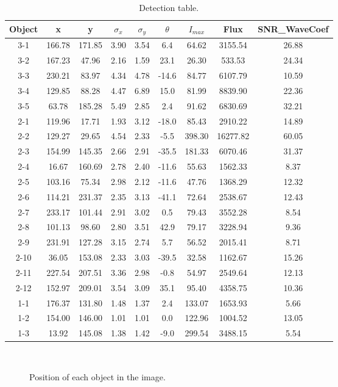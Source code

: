 \begin{table}[h]
\begin{center}
\begin{tabular}{||c||c|c|c|c|c|c|c|c||}
\hline
Object & x & y & $\sigma_x$ & $\sigma_y$ & $\theta$ &
	$I_{max} $ & Flux & SNR\_WaveCoef\\
\hline
\hline
3-1 & 166.78 & 171.85 & 3.90 & 3.54 & 6.4 & 64.62 & 3155.54  & 26.88\\
\hline
3-2 & 167.23 & 47.96 & 2.16 & 1.59 & 23.1 & 26.30 & 533.53  & 24.34  \\
\hline
3-3 & 230.21 & 83.97 & 4.34 & 4.78 & -14.6 & 84.77 & 6107.79 & 10.59  \\
\hline
3-4 & 129.85 & 88.28 & 4.47 & 6.89 & 15.0 & 81.99 & 8839.90 & 22.36 \\
\hline
3-5 & 63.78 & 185.28 & 5.49 & 2.85 & 2.4 & 91.62 & 6830.69 & 32.21 \\
\hline
2-1 & 119.96 & 17.71 & 1.93 & 3.12 & -18.0 & 85.43 & 2910.22 & 14.89 \\
\hline
2-2 & 129.27 & 29.65 & 4.54 & 2.33 & -5.5 & 398.30 & 16277.82  & 60.05 \\
\hline
2-3 & 154.99 & 145.35 & 2.66 & 2.91 & -35.5 & 181.33 & 6070.46 & 31.37  \\
\hline
2-4 & 16.67 & 160.69 & 2.78 & 2.40 & -11.6 & 55.63 & 1562.33 & 8.37 \\
\hline
2-5 & 103.16 & 75.34 & 2.98 & 2.12 & -11.6 & 47.76 & 1368.29 & 12.32 \\
\hline
2-6 & 114.21 & 231.37 & 2.35 & 3.13 & -41.1 & 72.64 & 2538.67 & 12.43 \\
\hline
2-7 & 233.17 & 101.44 & 2.91 & 3.02 & 0.5 & 79.43 & 3552.28  & 8.54 \\
\hline
2-8 & 101.13 & 98.60 & 2.80 & 3.51 & 42.9 & 79.17 & 3228.94 & 9.36 \\
\hline
2-9 & 231.91 & 127.28 & 3.15 & 2.74 & 5.7 & 56.52 & 2015.41 & 8.71 \\
\hline
2-10 & 36.05 & 153.08 & 2.33 & 3.03 & -39.5 & 32.58 & 1162.67  & 15.26 \\
\hline
2-11 & 227.54 & 207.51 & 3.36 & 2.98 & -0.8 & 54.97 & 2549.64 & 12.13 \\
\hline
2-12 & 152.97 & 209.01 & 3.54 & 3.09 & 35.1 & 95.40 & 4358.75  & 10.36 \\
\hline
1-1 & 176.37 & 131.80 & 1.48 & 1.37 & 2.4 & 133.07 & 1653.93 & 5.66 \\
\hline
1-2 & 154.00 & 146.00 & 1.01 & 1.01 & 0.0 & 122.96 & 1004.52 & 13.05 \\
\hline
1-3 & 13.92 & 145.08 & 1.38 & 1.42 & -9.0 & 299.54 & 3488.15 & 5.54  \\
\hline
\end{tabular}
\label{tabdetect}
\caption{Detection table.}
\end{center}
\end{table}

\begin{figure}[htb]
\centerline{
\hbox{
}}
\caption{Position of each object in the image.}
\label{fig_ima_obj}
\end{figure}

\clearpage


